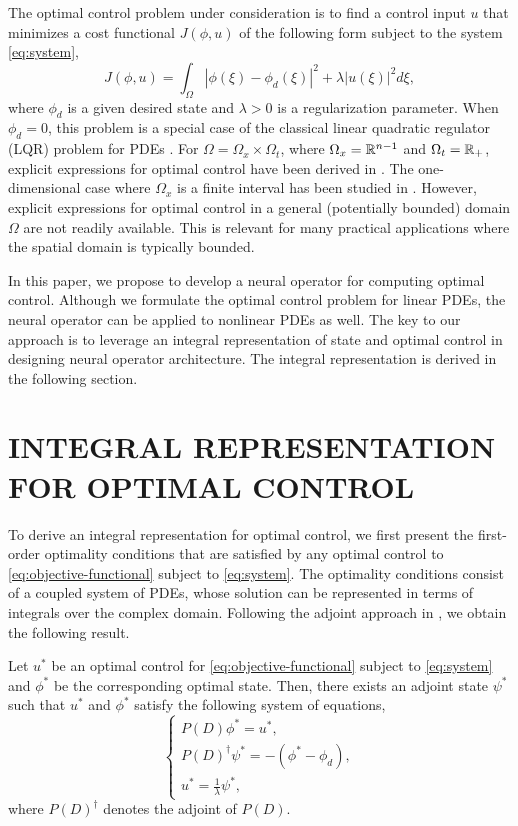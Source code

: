\documentclass[letterpaper, 10 pt, conference]{ieeeconf}  %
\begin{document}
The optimal control problem under consideration is to find a control input $u$ that minimizes a cost functional $J(\phi, u)$ of the following form subject to the system \eqref{eq:system},
\begin{equation}\label{eq:objective-functional}
      J(\phi,u) = \int_{\Omega} |\phi(\xi) - \phi_d(\xi)|^2 + \lambda |u(\xi)|^2 d\xi,
\end{equation}
where $\phi_d$ is a given desired state and $\lambda > 0$ is a regularization parameter.
When $\phi_d=0$, this problem is a special case of the classical linear quadratic regulator (LQR) problem for PDEs \cite{curtain2012introduction}.
For $\Omega=\Omega_x \times \Omega_t$, where $\Omega_x = \mathbb{R}^{n-1}$ and $\Omega_t = \mathbb{R}_+$, explicit expressions for optimal control have been derived in \cite{bamieh2002distributed}. 
The one-dimensional case where $\Omega_x$ is a finite interval has been studied in \cite{li2024complex}.
However, explicit expressions for optimal control in a general (potentially bounded) domain $\Omega$ are not readily available.
This is relevant for many practical applications where the spatial domain is typically bounded.

In this paper, we propose to develop a neural operator for computing optimal control. 
Although we formulate the optimal control problem for linear PDEs, the neural operator can be applied to nonlinear PDEs as well.
The key to our approach is to leverage an integral representation of state and optimal control in designing neural operator architecture.
The integral representation is derived in the following section.

\section{INTEGRAL REPRESENTATION FOR OPTIMAL CONTROL}
\label{sec:integral-representation}
To derive an integral representation for optimal control, we first present the first-order optimality conditions that are satisfied by any optimal control to \eqref{eq:objective-functional} subject to \eqref{eq:system}.
The optimality conditions consist of a coupled system of PDEs, whose solution can be represented in terms of integrals over the complex domain.
Following the adjoint approach in \cite[Section 1.6.3]{hinze2008optimization}, we obtain the following result.
\begin{lemma}
   Let $u^*$ be an optimal control for \eqref{eq:objective-functional} subject to \eqref{eq:system} and $\phi^*$ be the corresponding optimal state.
   Then, there exists an adjoint state $\psi^*$ such that $u^*$ and $\phi^*$ satisfy the following system of equations,
   \begin{equation}\label{eq:optimality-conditions}
   \begin{cases}
      P(D) \phi^* = u^*, \\
      P(D)^\dagger \psi^* = -(\phi^* - \phi_d), \\
      u^* = \frac{1}{\lambda} \psi^*,
   \end{cases}
   \end{equation}
   where $P(D)^\dagger$ denotes the adjoint of $P(D)$.
\end{lemma}
\end{document}
